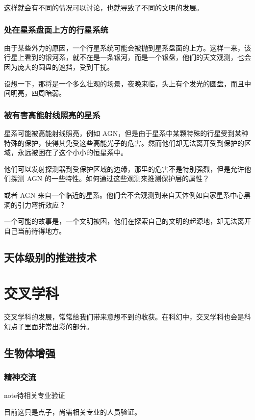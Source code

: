 \documentclass[letterpaper,10pt,english]{sphinxmanual}
\begin{document}
这样就会有不同的情况可以讨论，也就导致了不同的文明的发展。


\subsubsection{处在星系盘面上方的行星系统}
\label{astro:id5}
由于某些外力的原因，一个行星系统可能会被抛到星系盘面的上方。这样一来，该行星上看到的银河系，就不在是一条银河，而是一个银盘，他们的天文观测，也会因为庞大的圆盘的遮挡，受到干扰。

设想一下，那将是一个多么壮观的场景，夜晚来临，头上有个发光的圆盘，而且中间明亮，四周暗弱。


\subsubsection{被有害高能射线照亮的星系}
\label{astro:id6}
星系可能被高能射线照亮，例如 AGN，但是由于星系中某颗特殊的行星受到某种特殊的保护，使得其免受这些高能光子的危害。然而他们却无法离开受到保护的区域，永远被困在了这个小小的恒星系中。

他们可以发射探测器到受保护区域的边缘，那里的危害不是特别强烈，但是允许他们探测 AGN 的一些特性。如何通过这些观测来推测保护层的属性？

或者 AGN 来自一个临近的星系。他们会不会观测到来自天体例如自家星系中心黑洞的引力弯折效应？

一个可能的故事是，一个文明被困，他们在探索自己的文明的起源地，却无法离开自己当前待得地方。


\subsection{天体级别的推进技术}
\label{astro:id7}

\section{交叉学科}
\label{interdispline::doc}\label{interdispline:id1}
交叉学科的发展，常常给我们带来意想不到的收获。在科幻中，交叉学科也会是科幻点子里面非常出彩的部分。


\subsection{生物体增强}
\label{interdispline:id2}

\subsubsection{精神交流}
\label{interdispline:index-0}\label{interdispline:id3}
\begin{notice}{note}{待相关专业验证}

目前这只是点子，尚需相关专业的人员验证。
\end{notice}
\end{document}
